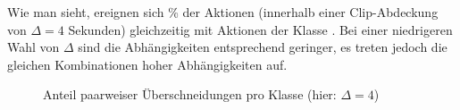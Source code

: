 Wie man sieht, ereignen sich  \% der Aktionen  (innerhalb einer Clip-Abdeckung von $\Delta=4$ Sekunden) gleichzeitig mit Aktionen der Klasse .
Bei einer niedrigeren Wahl von $\Delta$ sind die Abhängigkeiten entsprechend geringer, es treten jedoch die gleichen Kombinationen hoher Abhängigkeiten auf.

\begin{figure}
    \centering
    \caption{Anteil paarweiser Überschneidungen pro Klasse (hier: $\Delta = 4$)}
    \label{fig:overlaps}
\end{figure}
